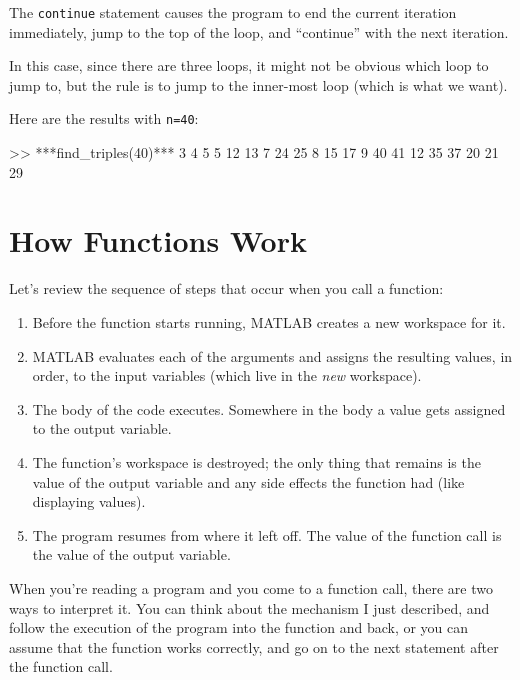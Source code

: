The {\tt continue} statement  causes the program to end the current iteration
immediately, jump to the top of the loop, and ``continue'' with the next iteration.

In this case, since there are three loops, it might not be obvious which loop to jump to, but the rule is to jump to the inner-most loop (which is what we want).

Here are the results with {\tt n=40}:

\begin{code}
>> ***find_triples(40)***
     3     4     5
     5    12    13
     7    24    25
     8    15    17
     9    40    41
    12    35    37
    20    21    29
\end{code}


\section{How Functions Work}

Let's review the sequence of steps that occur when you call a function:

\begin{enumerate}

\item Before the function starts running, MATLAB creates a new
workspace for it.

\item MATLAB evaluates each of the arguments and assigns
the resulting values, in order, to the input variables (which
live in the {\em new} workspace).

\item The body of the code executes.  Somewhere in the body
a value gets assigned to the output variable.

\item The function's workspace is destroyed; the only thing
that remains is the value of the output variable and any side
effects the function had (like displaying values).

\item The program resumes from where it left off.  The value
of the function call is the value of the output variable.

\end{enumerate}

When you're reading a program and you come to a function call,
there are two ways to interpret it. You can think about the mechanism I just described,
and follow the execution of the program into the function and back, or you can assume that the function works correctly, and go on to the next statement after the function call.

